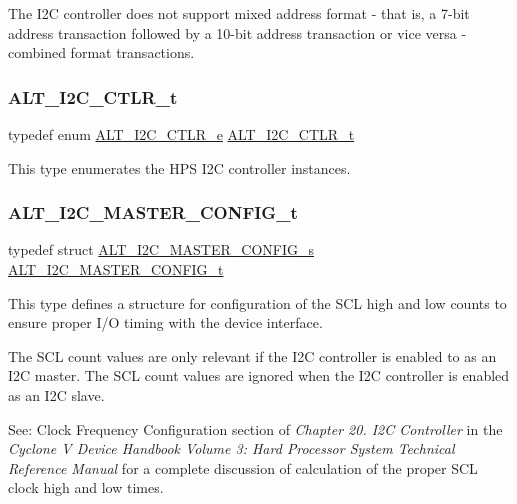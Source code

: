 The I2C controller does not support mixed address format -\/ that is, a 7-\/bit address transaction followed by a 10-\/bit address transaction or vice versa -\/ combined format transactions. \mbox{\label{group__ALT__I2C_ga1db51a8ca7c78d287a620a1f894ba1c5}} 
\subsubsection{\texorpdfstring{ALT\_I2C\_CTLR\_t}{ALT\_I2C\_CTLR\_t}}
{\footnotesize\ttfamily typedef enum \mbox{\hyperlink{group__ALT__I2C_ga01201dba4856c4a6fcf418d24b5d809a}{A\+L\+T\+\_\+\+I2\+C\+\_\+\+C\+T\+L\+R\+\_\+e}}  \mbox{\hyperlink{group__ALT__I2C_ga1db51a8ca7c78d287a620a1f894ba1c5}{A\+L\+T\+\_\+\+I2\+C\+\_\+\+C\+T\+L\+R\+\_\+t}}}

This type enumerates the H\+PS I2C controller instances. \mbox{\label{group__ALT__I2C_ga4f317dbba3080bb537f6c145ca30d503}} 
\subsubsection{\texorpdfstring{ALT\_I2C\_MASTER\_CONFIG\_t}{ALT\_I2C\_MASTER\_CONFIG\_t}}
{\footnotesize\ttfamily typedef struct \mbox{\hyperlink{structALT__I2C__MASTER__CONFIG__s}{A\+L\+T\+\_\+\+I2\+C\+\_\+\+M\+A\+S\+T\+E\+R\+\_\+\+C\+O\+N\+F\+I\+G\+\_\+s}}  \mbox{\hyperlink{group__ALT__I2C_ga4f317dbba3080bb537f6c145ca30d503}{A\+L\+T\+\_\+\+I2\+C\+\_\+\+M\+A\+S\+T\+E\+R\+\_\+\+C\+O\+N\+F\+I\+G\+\_\+t}}}

This type defines a structure for configuration of the S\+CL high and low counts to ensure proper I/O timing with the device interface.

The S\+CL count values are only relevant if the I2C controller is enabled to as an I2C master. The S\+CL count values are ignored when the I2C controller is enabled as an I2C slave.

See\+: Clock Frequency Configuration section of {\itshape Chapter 20. I2C Controller} in the {\itshape Cyclone V Device Handbook Volume 3\+: Hard Processor System Technical Reference Manual} for a complete discussion of calculation of the proper S\+CL clock high and low times. \mbox{\label{group__ALT__I2C_ga15e9cb79693e43e74075112b2aebe1e2}} 
